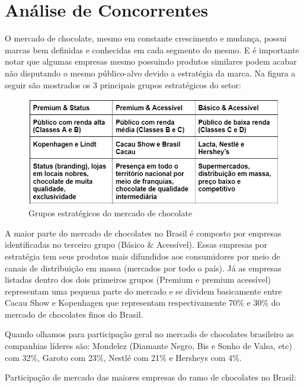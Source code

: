 \documentclass[
	12pt,				%
	openright,			%
	oneside,			%
	a4paper,			%
	english,			%
	french,				%
	spanish,			%
	brazil				%
	]{abntex2}
\begin{document}
\newpage
\chapter{Análise de Concorrentes}

O mercado de chocolate, mesmo em constante crescimento e mudança, possui marcas bem definidas e conhecidas em cada segmento do mesmo. E é importante notar que algumas empresas mesmo possuindo produtos similares podem acabar não disputando o mesmo público-alvo devido a estratégia da marca. Na figura a seguir são mostrados os 3 principais grupos estratégicos do setor:

\begin{figure}[H]
\begin{center}
\caption{Grupos estratégicos do mercado de chocolate}
\includegraphics[scale=0.5]{WhatsApp Image 2022-08-19 at 19.04.28.jpeg} 
\end{center}
\end{figure}

A maior parte do mercado de chocolates no Brasil é composto por empresas identificadas no terceiro grupo (Básico $\&$ Acessível). Essas empresas por estratégia tem seus produtos mais difundidos aos consumidores por meio de canais de distribuição em massa (mercados por todo o país). Já as empresas listadas dentro dos dois primeiros grupos (Premium e premium acessível) representam uma pequena parte do mercado e se dividem basicamente entre Cacau Show e Kopenhagen que representam respectivamente 70$\%$ e 30$\%$ do mercado de chocolates finos do Brasil.

Quando olhamos para participação geral no mercado de chocolates brasileiro as companhias líderes são: Mondelez (Diamante Negro, Bis e Sonho de Valsa, etc) com 32$\%$, Garoto com 23$\%$, Nestlé com 21$\%$ e Hersheys com 4$\%$.

Participação de mercado das maiores empresas do ramo de chocolates no Brasil: 
\end{document}
